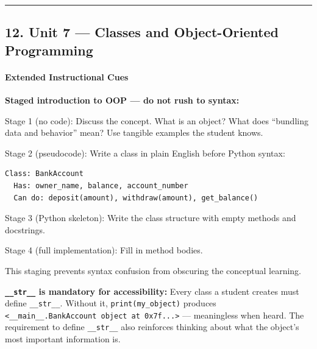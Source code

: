 \documentclass[
  justified,
  openright,
]{tufte-book}
\let\subsubsection\paragraph
\let\paragraph\paragraph
\newcommand{\ControlFlowTok}[1]{\textcolor{BrandBlue}{#1}}
\newcommand{\FunctionTok}[1]{\textcolor{BrandBlue}{#1}}
\newcommand{\KeywordTok}[1]{\textcolor{BrandBlue}{#1}}
\newcommand{\NormalTok}[1]{#1}
\newcommand{\SpecialCharTok}[1]{\textcolor{Teal}{#1}}
\newcommand{\SpecialStringTok}[1]{\textcolor{Teal}{#1}}
\newcommand{\VariableTok}[1]{#1}
\newenvironment{Shaded}{%
  \begin{snugshade}
}{%
  \end{snugshade}
}
\let\subsubsection\paragraph
\let\paragraph\paragraph
\begin{document}
\begin{center}\rule{0.5\linewidth}{0.5pt}\end{center}

\subsection{12. Unit 7 --- Classes and Object-Oriented
Programming}\label{unit-7-classes-and-object-oriented-programming}

\subsubsection{Extended Instructional
Cues}\label{extended-instructional-cues}

\textbf{Staged introduction to OOP --- do not rush to syntax:}

Stage 1 (no code): Discuss the concept. What is an object? What does
``bundling data and behavior'' mean? Use tangible examples the student
knows.

Stage 2 (pseudocode): Write a class in plain English before Python
syntax:

\begin{verbatim}
Class: BankAccount
  Has: owner_name, balance, account_number
  Can do: deposit(amount), withdraw(amount), get_balance()
\end{verbatim}

Stage 3 (Python skeleton): Write the class structure with empty methods
and docstrings.

Stage 4 (full implementation): Fill in method bodies.

This staging prevents syntax confusion from obscuring the conceptual
learning.

\textbf{\texttt{\_\_str\_\_} is mandatory for accessibility:} Every
class a student creates must define \texttt{\_\_str\_\_}. Without it,
\texttt{print(my\_object)} produces
\texttt{\textless{}\_\_main\_\_.BankAccount\ object\ at\ 0x7f...\textgreater{}}
--- meaningless when heard. The requirement to define
\texttt{\_\_str\_\_} also reinforces thinking about what the object's
most important information is.

\begin{Shaded}
\end{Shaded}
\end{document}

